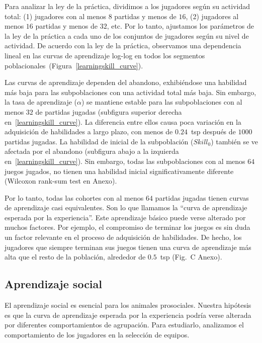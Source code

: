 \documentclass[a4paper,11pt]{book}
\theoremstyle{definition}
\begin{document}

Para analizar la ley de la práctica, dividimos a los jugadores seg\'un su actividad total: (1) jugadores con al menos $8$ partidas y menos de $16$, (2) jugadores al menos $16$ partidas y menos de $32$, etc.
%
Por lo tanto, ajustamos los parámetros de la ley de la práctica a cada uno de los conjuntos de jugadores seg\'un su nivel de actividad.
%
De acuerdo con la ley de la práctica, observamos una dependencia lineal en las curvas de aprendizaje log-log en todos los segmentos poblacionales~(Figura~\ref{learningskill_curve}).


Las curvas de aprendizaje dependen del abandono, exhibiéndose una habilidad más baja para las subpoblaciones con una actividad total más baja.
%
Sin embargo, la tasa de aprendizaje ($\alpha$) se mantiene estable para las subpoblaciones con al menos $32$ de partidas jugadas (subfigura superior derecha en~\ref{learningskill_curve}).
%
La diferencia entre ellos causa poca variaci\'on en la adquisici\'on de habilidades a largo plazo, con menos de $0.24$~tsp después de $1000$ partidas jugadas.
%
La habilidad de inicial de la subpoblaci\'on ($Skill_0$) también se ve afectada por el abandono (subfigura abajo a la izquierda en~\ref{learningskill_curve}).
%
Sin embargo, todas las subpoblaciones con al menos $64$ juegos jugados, no tienen una habilidad inicial significativamente diferente (Wilcoxon rank-sum test en Anexo).


Por lo tanto, todas las cohortes con al menos $64$ partidas jugadas tienen curvas de aprendizaje casi equivalentes.
%
Son lo que llamamos la ``curva de aprendizaje esperada por la experiencia''.
%
Este aprendizaje básico puede verse alterado por muchos factores.
%
Por ejemplo, el compromiso de terminar los juegos es sin duda un factor relevante en el proceso de adquisici\'on de habilidades.
%
De hecho, los jugadores que siempre terminan sus juegos tienen una curva de aprendizaje más alta que el resto de la poblaci\'on, alrededor de $0.5$~tsp (Fig.~C Anexo).

\subsection{Aprendizaje social}

El aprendizaje social es esencial para los animales prosociales.
%
Nuestra hip\'otesis es que la curva de aprendizaje esperada por la experiencia podr\'ia verse alterada por diferentes comportamientos de agrupaci\'on.
%
Para estudiarlo, analizamos el comportamiento de los jugadores en la selecci\'on de equipos.
\end{document}

